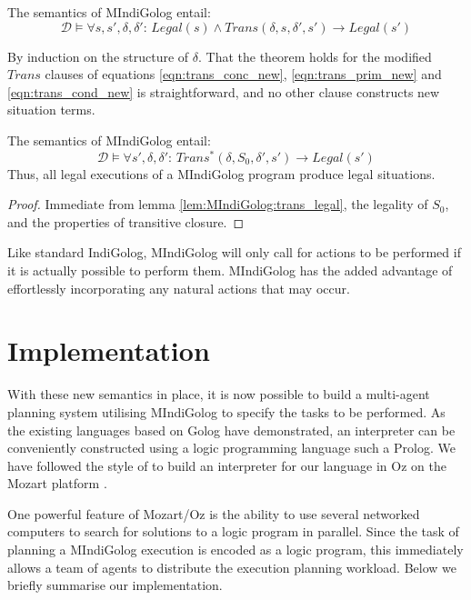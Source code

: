 \begin{lemma}
The semantics of MIndiGolog entail:\label{lem:MIndiGolog:trans_legal}\[
\mathcal{D}\models\forall s,s',\delta,\delta':\, Legal(s)\wedge Trans(\delta,s,\delta',s')\rightarrow Legal(s')\]

\end{lemma}
\begin{proofsketch}
By induction on the structure of $\delta$. That the theorem holds
for the modified $Trans$ clauses of equations \eqref{eqn:trans_conc_new},
\eqref{eqn:trans_prim_new} and \eqref{eqn:trans_cond_new} is straightforward,
and no other clause constructs new situation terms. 
\end{proofsketch}
\begin{thm}
The semantics of MIndiGolog entail: \[
\mathcal{D}\models\forall s',\delta,\delta':\, Trans^{*}(\delta,S_{0},\delta',s')\rightarrow Legal(s')\]
 Thus, all legal executions of a MIndiGolog program produce legal
situations. 
\end{thm}
\begin{proof}
Immediate from lemma \ref{lem:MIndiGolog:trans_legal}, the legality
of $S_{0}$, and the properties of transitive closure. 
\end{proof}
Like standard IndiGolog, MIndiGolog will only call for actions to
be performed if it is actually possible to perform them. MIndiGolog
has the added advantage of effortlessly incorporating any natural
actions that may occur.


\section{Implementation\label{sec:MIndiGolog:Implementation}}

With these new semantics in place, it is now possible to build a multi-agent
planning system utilising MIndiGolog to specify the tasks to be performed.
As the existing languages based on Golog have demonstrated, an interpreter
can be conveniently constructed using a logic programming language
such a Prolog. We have followed the style of \citep{giacomo00congolog,giacomo99indigolog}
to build an interpreter for our language in Oz on the Mozart platform
\citep{vanroy03mozart_logic}.

One powerful feature of Mozart/Oz is the ability to use several networked
computers to search for solutions to a logic program in parallel.
Since the task of planning a MIndiGolog execution is encoded as a
logic program, this immediately allows a team of agents to distribute
the execution planning workload. Below we briefly summarise our implementation.


